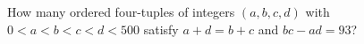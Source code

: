 How many ordered four-tuples of integers $(a,b,c,d)$ with $0<a<b<c<d<500$ satisfy $a+d=b+c$ and $bc-ad=93$?
